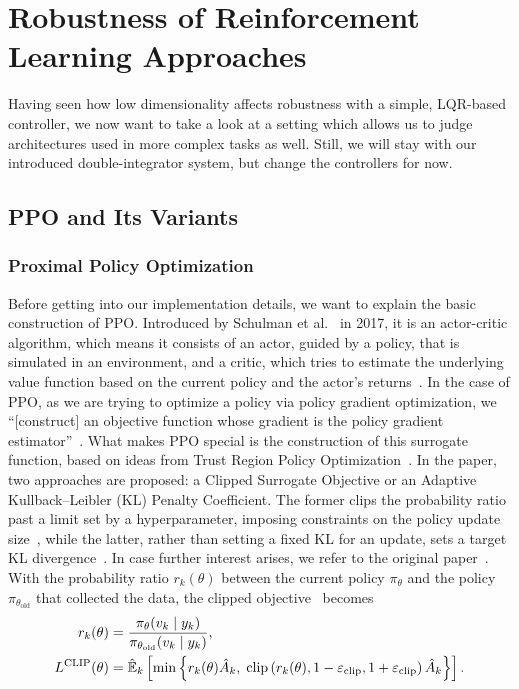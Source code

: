 \chapter{Robustness of Reinforcement Learning Approaches}
\label{chap:inflation}

Having seen how low dimensionality affects robustness with a simple, LQR-based controller, we
now want to take a look at a setting which allows us to judge architectures used in more
complex tasks as well. Still, we will stay with our introduced double-integrator system,
but change the controllers for now.

\section{PPO and Its Variants}
\label{sec:ppo-variants}

\subsection{Proximal Policy Optimization}
\label{subsec:ppo}

Before getting into our implementation details, we want to explain the basic construction
of PPO. Introduced by Schulman et al.~\cite{Schulman2017Proximal} in 2017, it is an actor-critic algorithm,
which means it consists of an actor, guided by a policy, that is simulated in an environment,
and a critic, which tries to estimate the underlying value function based on the current policy
and the actor's returns~\cite{Konda2000ActorCritic}. In the case of PPO, as we are trying to optimize a policy
via policy gradient optimization, we ``[construct] an objective function whose gradient is the policy
gradient estimator''~\cite[Sec.~2.1]{Schulman2017Proximal}. What makes PPO special is the construction of this surrogate
function, based on ideas from Trust Region Policy Optimization~\cite{Schulman2015Trust}.
In the paper, two approaches are proposed: a Clipped Surrogate Objective or an Adaptive Kullback--Leibler (KL)
Penalty Coefficient. The former clips the probability ratio past a limit set by a hyperparameter,
imposing constraints on the policy update size~\cite[Sec.~3]{Schulman2017Proximal}, while the latter, rather than setting
a fixed KL for an update, sets a target KL divergence~\cite[Sec.~4]{Schulman2017Proximal}. In case further interest
arises, we refer to the original paper~\cite{Schulman2017Proximal}.
With the probability ratio $r_k(\theta)$ between the current policy $\pi_\theta$ and the policy
$\pi_{\theta_{\mathrm{old}}}$ that collected the data, the clipped objective~\cite[Sec.~3, Eq.~(7)]{Schulman2017Proximal} becomes
\begin{equation}
    \label{eq:ppo-clip}
    \begin{aligned}
        r_k(\theta) &= \frac{\pi_\theta(v_k \mid y_k)}{\pi_{\theta_{\mathrm{old}}}(v_k \mid y_k)} , \\
        L^{\mathrm{CLIP}}(\theta) &= \hat{\mathbb{E}}_k \left[ \min\left\{ r_k(\theta) \hat{A}_k ,\;
            \operatorname{clip}\left( r_k(\theta), 1 - \varepsilon_{\mathrm{clip}}, 1 + \varepsilon_{\mathrm{clip}} \right) \hat{A}_k \right\} \right] .
    \end{aligned}
\end{equation}

